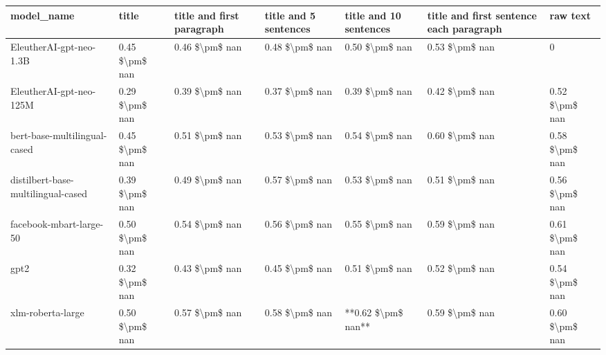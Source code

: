 \begin{tabular}{lllllll}
\toprule
                        model\_name &          title & title and first paragraph & title and 5 sentences & title and 10 sentences & title and first sentence each paragraph &       raw text \\
\midrule
           EleutherAI-gpt-neo-1.3B & 0.45 \$\textbackslash pm\$ nan &            0.46 \$\textbackslash pm\$ nan &        0.48 \$\textbackslash pm\$ nan &         0.50 \$\textbackslash pm\$ nan &                          0.53 \$\textbackslash pm\$ nan &              0 \\
           EleutherAI-gpt-neo-125M & 0.29 \$\textbackslash pm\$ nan &            0.39 \$\textbackslash pm\$ nan &        0.37 \$\textbackslash pm\$ nan &         0.39 \$\textbackslash pm\$ nan &                          0.42 \$\textbackslash pm\$ nan & 0.52 \$\textbackslash pm\$ nan \\
      bert-base-multilingual-cased & 0.45 \$\textbackslash pm\$ nan &            0.51 \$\textbackslash pm\$ nan &        0.53 \$\textbackslash pm\$ nan &         0.54 \$\textbackslash pm\$ nan &                          0.60 \$\textbackslash pm\$ nan & 0.58 \$\textbackslash pm\$ nan \\
distilbert-base-multilingual-cased & 0.39 \$\textbackslash pm\$ nan &            0.49 \$\textbackslash pm\$ nan &        0.57 \$\textbackslash pm\$ nan &         0.53 \$\textbackslash pm\$ nan &                          0.51 \$\textbackslash pm\$ nan & 0.56 \$\textbackslash pm\$ nan \\
           facebook-mbart-large-50 & 0.50 \$\textbackslash pm\$ nan &            0.54 \$\textbackslash pm\$ nan &        0.56 \$\textbackslash pm\$ nan &         0.55 \$\textbackslash pm\$ nan &                          0.59 \$\textbackslash pm\$ nan & 0.61 \$\textbackslash pm\$ nan \\
                              gpt2 & 0.32 \$\textbackslash pm\$ nan &            0.43 \$\textbackslash pm\$ nan &        0.45 \$\textbackslash pm\$ nan &         0.51 \$\textbackslash pm\$ nan &                          0.52 \$\textbackslash pm\$ nan & 0.54 \$\textbackslash pm\$ nan \\
                 xlm-roberta-large & 0.50 \$\textbackslash pm\$ nan &            0.57 \$\textbackslash pm\$ nan &        0.58 \$\textbackslash pm\$ nan &     **0.62 \$\textbackslash pm\$ nan** &                          0.59 \$\textbackslash pm\$ nan & 0.60 \$\textbackslash pm\$ nan \\
\bottomrule
\end{tabular}
